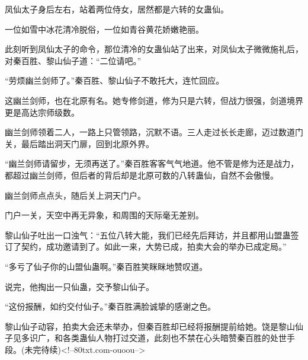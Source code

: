 \begin{this_body}
凤仙太子身后左右，站着两位侍女，居然都是六转的女蛊仙。

一位如雪中冰花清冷脱俗，一位如青谷黄花娇嫩艳丽。

此刻听到凤仙太子的命令，那位清冷的女蛊仙站了出来，对凤仙太子微微施礼后，对秦百胜、黎山仙子道：“二位请吧。”

“劳烦幽兰剑师了。”秦百胜、黎山仙子不敢托大，连忙回应。

这幽兰剑师，也在北原有名。她专修剑道，修为只是六转，但战力很强，剑道境界更是高达宗师级数。

幽兰剑师领着二人，一路上只管领路，沉默不语。三人走过长长走廊，迈过数道门关，最后踏出洞天门扉，回到北原外界。

“幽兰剑师请留步，无须再送了。”秦百胜客客气气地道。他不管是修为还是战力，都超过幽兰剑师，但后者的背后却是北原可数的八转蛊仙，自然不会傲慢。

幽兰剑师点点头，随后关上洞天门户。

门户一关，天空中再无异象，和周围的天际毫无差别。

黎山仙子吐出一口浊气：“五位八转大能，我们已经先后拜访，并且都用山盟蛊签订了契约，成功邀请到了。如此一来，大势已成，拍卖大会的举办已成定局。”

“多亏了仙子你的山盟仙蛊啊。”秦百胜笑眯眯地赞叹道。

说完，他掏出一只仙蛊，交予黎山仙子。

“这份报酬，如约交付仙子。”秦百胜满脸诚挚的感谢之色。

黎山仙子动容，拍卖大会还未举办，但秦百胜却已经将报酬提前给她。饶是黎山仙子见多识广，和各类蛊仙人物打过交道，此刻也不禁在心头暗赞秦百胜的处世手段。(未完待续)<!--80txt.com-ouoou-->

\end{this_body}


